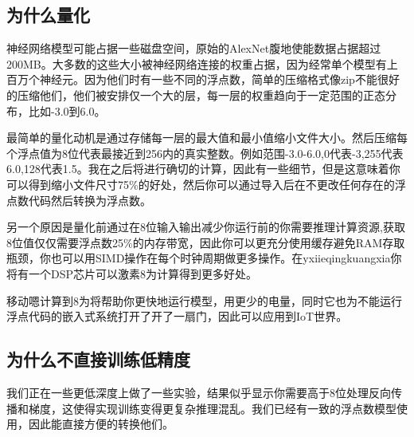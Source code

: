 \subsection{为什么量化}
神经网络模型可能占据一些磁盘空间，原始的AlexNet腹地使能数据占据超过200MB。大多数的这些大小被神经网络连接的权重占据，因为经常单个模型有上百万个神经元。因为他们时有一些不同的浮点数，简单的压缩格式像zip不能很好的压缩他们，他们被安排仅一个大的层，每一层的权重趋向于一定范围的正态分布，比如-3.0到6.0。

最简单的量化动机是通过存储每一层的最大值和最小值缩小文件大小。然后压缩每个浮点值为8位代表最接近到256内的真实整数。例如范围-3.0-6.0,0代表-3,255代表6.0,128代表1.5。我在之后将进行确切的计算，因此有一些细节，但是这意味着你可以得到缩小文件尺寸75\%的好处，然后你可以通过导入后在不更改任何存在的浮点数代码然后转换为浮点数。

另一个原因是量化前通过在8位输入输出减少你运行前的你需要推理计算资源,获取8位值仅仅需要浮点数25\%的内存带宽，因此你可以更充分使用缓存避免RAM存取瓶颈，你也可以用SIMD操作在每个时钟周期做更多操作。在yxiieqingkuangxia你将有一个DSP芯片可以激素8为计算得到更多好处。

移动嗯计算到8为将帮助你更快地运行模型，用更少的电量，同时它也为不能运行浮点代码的嵌入式系统打开了开了一扇门，因此可以应用到IoT世界。

\subsection{为什么不直接训练低精度}
我们正在一些更低深度上做了一些实验，结果似乎显示你需要高于8位处理反向传播和梯度，这使得实现训练变得更复杂推理混乱。我们已经有一致的浮点数模型使用，因此能直接方便的转换他们。

